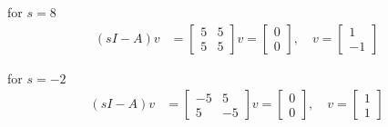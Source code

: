 \documentclass[12pt,a4paper]{article}
\begin{document}
for $s = 8$
\begin{align*}
	(sI - A)v &= \begin{bmatrix}
		5 & 5 \\ 5 & 5
	\end{bmatrix}v = \begin{bmatrix}
	0 \\ 0
	\end{bmatrix}, \quad v = \begin{bmatrix}
	1 \\ -1 
	\end{bmatrix}
\end{align*}

for $s = -2$
\begin{align*}
	(sI - A)v &= \begin{bmatrix}
		-5 & 5 \\ 5 & -5
	\end{bmatrix}	v = \begin{bmatrix}
	0 \\ 0
	\end{bmatrix}, \quad v = \begin{bmatrix}
	1 \\ 1 
\end{bmatrix}
\end{align*}
\end{document}
